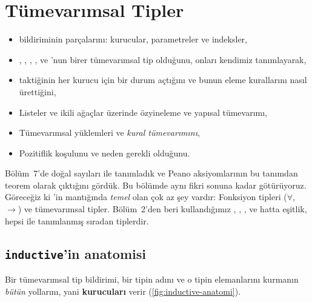 \chapter{Tümevarımsal Tipler}\label{bol:tumevarimsal-tipler}

\begin{bolumhedefleri}
\begin{itemize}
  \item {} bildiriminin parçalarını: kurucular,
        parametreler ve indeksler,
  \item {}, , , ,  ve
        'nun birer tümevarımsal tip olduğunu, onları kendimiz
        tanımlayarak,
  \item {} taktiğinin her kurucu için bir durum açtığını ve
        bunun eleme kurallarını nasıl ürettiğini,
  \item Listeler ve ikili ağaçlar üzerinde özyineleme ve yapısal
        tümevarımı,
  \item Tümevarımsal yüklemleri ve \emph{kural tümevarımını},
  \item Pozitiflik koşulunu ve neden gerekli olduğunu.
\end{itemize}
\end{bolumhedefleri}

Bölüm~7'de doğal sayıları  ile tanımladık ve Peano
aksiyomlarının bu tanımdan teorem olarak çıktığını gördük. Bu bölümde aynı
fikri sonuna kadar götürüyoruz. Göreceğiz ki \Lean{}'in mantığında
\emph{temel} olan çok az şey vardır: Fonksiyon tipleri ($\forall$, $\to$)
ve tümevarımsal tipler. Bölüm~2'den beri kullandığımız , ,
,  ve hatta eşitlik, hepsi  ile
tanımlanmış sıradan tiplerdir.

\section{\texorpdfstring{\texttt{inductive}}{inductive}'in anatomisi}\label{sec:inductive-anatomi}

Bir tümevarımsal tip bildirimi, bir tipin adını ve o tipin elemanlarını
kurmanın \emph{bütün} yollarını, yani \textbf{kurucuları} verir
(\cref{fig:inductive-anatomi}).

